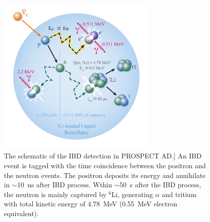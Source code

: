 \begin{figure}[h]
    \centering
    \includegraphics[width=0.7\textwidth]{Figures/IBDSchematic.pdf}
    \caption[IBD detection schematic]{The schematic of the IBD detection in PROSPECT AD.]
	An IBD event is tagged with the time coincidence between the positron and the neutron events.
	The positron deposits its energy and annihilate in $\sim$10~ns after IBD process.
	Wthin $\sim$50~\textmu s after the IBD process, the neutron is mainly captured by $^6$Li, generating $\alpha$ and tritium with total kinetic energy of 4.78~MeV (0.55~MeV electron equivalent).}
    \label{fig:IBDscheme}
\end{figure}

